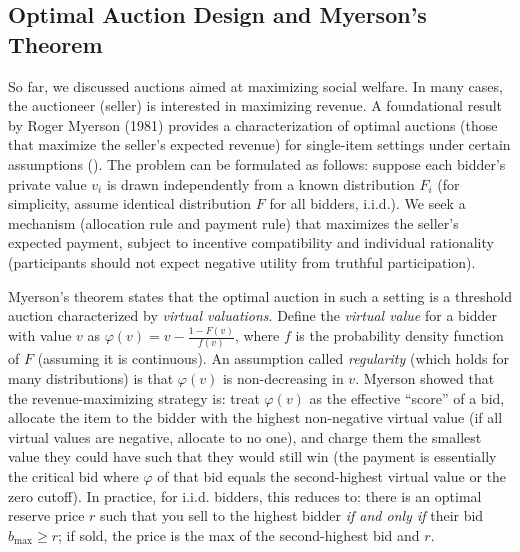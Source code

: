 \documentclass[
  letterpaper,
  numbers=noenddot,
  DIV=11]{scrreprt}
\theoremstyle{definition}
\theoremstyle{plain}
\theoremstyle{plain}
\theoremstyle{remark}
\begin{document}
\subsection{Optimal Auction Design and Myerson's
Theorem}\label{optimal-auction-design-and-myersons-theorem}

So far, we discussed auctions aimed at maximizing social welfare. In
many cases, the auctioneer (seller) is interested in maximizing revenue.
A foundational result by Roger Myerson (1981) provides a
characterization of optimal auctions (those that maximize the seller's
expected revenue) for single-item settings under certain assumptions
(). The problem can be
formulated as follows: suppose each bidder's private value \(v_i\) is
drawn independently from a known distribution \(F_i\) (for simplicity,
assume identical distribution \(F\) for all bidders, i.i.d.). We seek a
mechanism (allocation rule and payment rule) that maximizes the seller's
expected payment, subject to incentive compatibility and individual
rationality (participants should not expect negative utility from
truthful participation).

Myerson's theorem states that the optimal auction in such a setting is a
threshold auction characterized by \emph{virtual valuations}. Define the
\emph{virtual value} for a bidder with value \(v\) as
\(\varphi(v) = v - \frac{1-F(v)}{f(v)}\), where \(f\) is the probability
density function of \(F\) (assuming it is continuous). An assumption
called \emph{regularity} (which holds for many distributions) is that
\(\varphi(v)\) is non-decreasing in \(v\). Myerson showed that the
revenue-maximizing strategy is: treat \(\varphi(v)\) as the effective
``score'' of a bid, allocate the item to the bidder with the highest
non-negative virtual value (if all virtual values are negative, allocate
to no one), and charge them the smallest value they could have such that
they would still win (the payment is essentially the critical bid where
\(\varphi\) of that bid equals the second-highest virtual value or the
zero cutoff). In practice, for i.i.d. bidders, this reduces to: there is
an optimal reserve price \(r\) such that you sell to the highest bidder
\emph{if and only if} their bid \(b_{\max} \ge r\); if sold, the price
is the max of the second-highest bid and \(r\).
\end{document}
